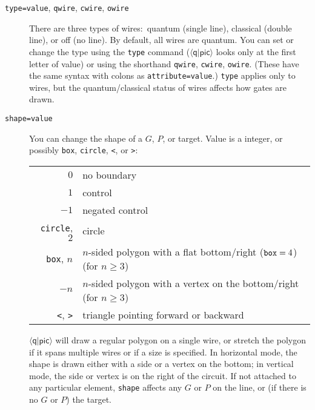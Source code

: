 \documentclass[twoside,12pt]{article}
\newcommand{\qpic}{$\langle\mathsf{q}|\mathsf{pic}\rangle$\xspace}
\begin{document}
\begin{description}
\item[{\tt type=value}, {\tt qwire}, {\tt cwire}, {\tt owire}] There are
  three types of wires:\ quantum (single line), classical (double line),
  or off (no line).  By default, all wires are quantum.  You can set or change
  the type using the {\tt type} command (\qpic looks only at the first letter
  of value) or using the shorthand {\tt qwire}, {\tt cwire}, {\tt owire}.
  (These have the same syntax with colons as {\tt attribute=value}.)
  {\tt type} applies only to wires, but the quantum/classical status of
  wires affects how gates are drawn.

\begin{minipage}[b]{2in}

\end{minipage} \hfill 

\item[{\tt shape=value}] You can change the shape of
  a $G$, $P$, or target.  Value is a integer, or possibly {\tt box}, {\tt circle}, {\tt <}, or {\tt >}:
  \begin{center}
    \begin{tabular}{r|l}
      $0$ & no boundary \\
      $1$ & control \\
      $-1$ & negated control \\
      {\tt circle}, $2$ & circle \\
      {\tt box}, $n$ & $n$-sided polygon with a flat bottom/right (${\tt box}=4$) (for $n \ge 3$) \\
      $-n$ & $n$-sided polygon with a vertex on the bottom/right (for $n \ge 3$) \\
      {\tt <}, {\tt >} & triangle pointing forward or backward
    \end{tabular}
  \end{center}
  \qpic will draw a regular polygon on a single wire, or stretch the polygon if it
  spans multiple wires or if a size is specified.  In horizontal mode,
the shape is drawn either with a side or a vertex on the bottom;
in vertical mode, the side or vertex is on the right of the circuit.
  If not attached to any particular element, {\tt shape} affects
  any $G$ or $P$ on the line, or (if there is no $G$ or $P$) the target.

\begin{minipage}[b]{3in}

\end{minipage} \hfill 


\end{description}
\end{document}
